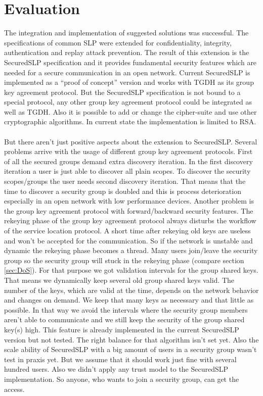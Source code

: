 \section{Evaluation}\label{sec:evaluation}
The integration and implementation of suggested solutions was successful. The specifications of common SLP were extended for confidentiality, integrity, authentication and replay attack prevention. The result of this extension is the SecuredSLP specification and it provides fundamental security features which are needed for a secure communication in an open network. Current SecuredSLP is implemented as a ``proof of concept'' version and works with TGDH as its group key agreement protocol. But the SecuredSLP specification is not bound to a special protocol, any other group key agreement protocol could be integrated as well as TGDH. Also it is possible to add or change the cipher-suite and use other cryptographic algorithms. In current state the implementation is limited to RSA.\\\\
But there aren't just positive aspects about the extension to SecuredSLP. Several problems arrive with the usage of different group key agreement protocols. First of all the secured groups demand extra discovery iteration. In the first discovery iteration a user is just able to discover all plain scopes. To discover the security scopes/groups the user needs second discovery iteration. That means that the time to discover a security group is doubled and this is process deterioration especially in an open network with low performance devices. Another problem is the group key agreement protocol with forward/backward security features. The rekeying phase of the group key agreement protocol always disturbs the workflow of the service location protocol. A short time after rekeying old keys are useless and won't be accepted for the communication. So if the network is unstable and dynamic the rekeying phase becomes a thread. Many users join/leave the security group so the security group will stuck in the rekeying phase (compare section \ref{sec:DoS}). For that purpose we got validation intervals for the group shared keys. That means we dynamically keep several old group shared keys valid. The number of the keys, which are valid at the time, depends on the network behavior and changes on demand. We keep that many keys as necessary and that little as possible. In that way we avoid the intervals where the security group members aren't able to communicate and we still keep the security of the group shared key(s) high. This feature is already implemented in the current SecuredSLP version but not tested. The right balance for that algorithm isn't set yet. Also the scale ability of SecuredSLP with a big amount of users in a security group wasn't test in praxis yet. But we assume that it should work just fine with several hundred users. Also we didn't apply any trust model to the SecuredSLP implementation. So anyone, who wants to join a security group, can get the access.\\

